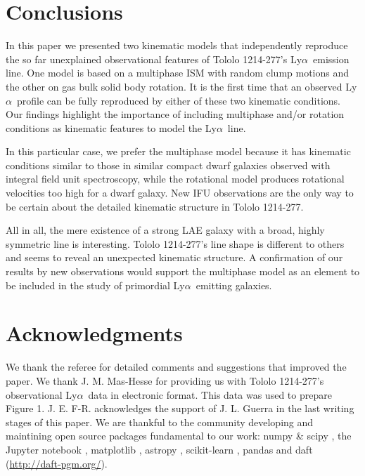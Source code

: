 \documentclass[a4paper,fleqn,usenatbib]{mnras}
\newcommand{\tol}{Tololo 1214-277}
\newcommand{\lya}{\ifmmode{{\rm Ly}\alpha}\else Ly$\alpha$\ \fi}
\begin{document}
\section{Conclusions}
\label{sec:conclusions}

In this paper we presented two kinematic models that independently
reproduce the so far unexplained observational features of \tol's
\lya emission line.
One model is based on a multiphase ISM with random clump motions and
the other on gas bulk solid body rotation. 
It is the first time that an observed \lya profile can be fully
reproduced by either of these two kinematic conditions.
Our findings highlight the importance of including multiphase and/or
rotation conditions as kinematic features to model the \lya line.

In this particular case, we prefer the multiphase model because it has kinematic
conditions similar to those in similar compact dwarf galaxies observed
with integral field unit spectroscopy, while the
rotational model produces rotational velocities too high for a dwarf
galaxy.  
New IFU observations are the only way to be certain about the detailed
kinematic structure in \tol.  

All in all, the mere existence of a strong LAE galaxy with a broad,
highly symmetric line is interesting. 
\tol's line shape is different to others and seems to reveal an
unexpected kinematic structure.
A confirmation of our results by new observations would support the multiphase model
as an element to be included in the study of primordial \lya emitting
galaxies.
 
\section*{Acknowledgments}
We thank the referee for detailed comments and suggestions that
improved the paper. 
We thank J. M. Mas-Hesse for providing us with \tol's observational
\lya data \citep{mashesse03} in electronic format. This data was
used to prepare Figure 1.
J. E. F-R. acknowledges the support of J. L. Guerra in the last
writing stages of this paper.
We are thankful to the community developing and maintining open source
packages fundamental to our work: numpy \& scipy \citep{numpy}, the
Jupyter notebook \citep{IPython,jupyter}, matplotlib
\citep{matplotlib}, astropy \citep{astropy},  scikit-learn
\citep{scikit-learn}, pandas \citep{pandas} and daft
(\url{http://daft-pgm.org/}).  
\end{document}
